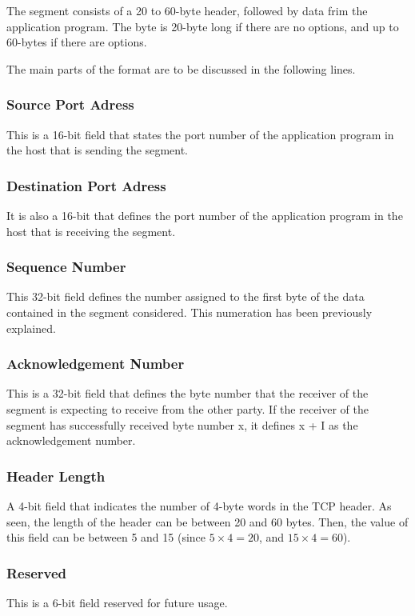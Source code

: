 The segment consists of a 20 to 60-byte header, followed by data frim the application program. The byte is 20-byte long if there are no options, and up to 60-bytes if there are options. 

The main parts of the format are to be discussed in the following lines.

\subsubsection*{Source Port Adress}
This is a 16-bit field that states the port number of the application program in the host that is sending the segment. 

\subsubsection*{Destination Port Adress}
It is also a 16-bit that defines the port number of the application program in the host that is receiving the segment. 

\subsubsection*{Sequence Number}
This 32-bit field defines the number assigned to the first byte of the data contained in the segment considered. This numeration has been previously explained.

\subsubsection*{Acknowledgement Number}
This is a 32-bit field that defines the byte number that the receiver of the segment is expecting to receive from the other party. If the receiver of the segment has successfully received byte number x, it defines x + I as the acknowledgement number. 

\subsubsection*{Header Length}
A 4-bit field that indicates the number of 4-byte words in the TCP header. As seen, the length of the header can be between 20 and 60 bytes. Then, the value of this field can be between 5 and 15 (since $5\times	4=20$, and $15\times	4=60$). 

\subsubsection*{Reserved}
This is a 6-bit field reserved for future usage.

